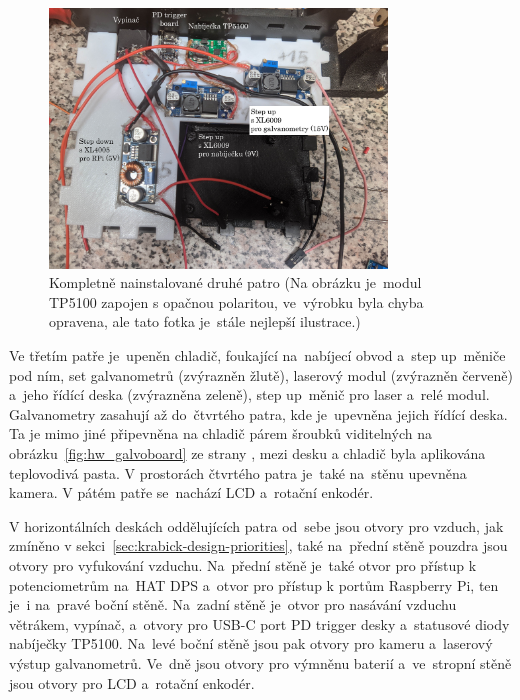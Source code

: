 \begin{figure}[htb]
  \centering
  \includegraphics[width=0.8\textwidth]{img/hw_layer0.jpg}
  \caption{\label{fig:hw_layer0} Kompletně nainstalované druhé patro (Na obrázku je~modul TP5100 zapojen s opačnou polaritou, ve~výrobku byla chyba opravena, ale tato fotka je~stále nejlepší ilustrace.)}
\end{figure}

Ve třetím patře je~upeněn chladič, foukající na~nabíjecí obvod a~step up~měniče pod ním, set galvanometrů (zvýrazněn žlutě), laserový modul (zvýrazněn červeně) a~jeho řídící deska (zvýrazněna zeleně), step up~měnič pro laser a~relé modul.  
Galvanometry zasahují až do~čtvrtého patra, kde je~upevněna jejich řídící deska. Ta je mimo jiné připevněna na chladič párem šroubků viditelných na obrázku~\ref{fig:hw_galvoboard} ze strany \pageref{fig:hw_galvoboard}, mezi desku a chladič byla aplikována teplovodivá pasta. V prostorách čtvrtého patra je~také na~stěnu upevněna kamera.
V pátém patře se~nachází LCD a~rotační enkodér.

V horizontálních deskách oddělujících patra od~sebe jsou otvory pro vzduch, jak zmíněno v sekci~\ref{sec:krabick-design-priorities}, také na~přední stěně pouzdra jsou otvory pro vyfukování vzduchu. Na~přední stěně je~také otvor pro přístup k potenciometrům na~HAT DPS a~otvor pro přístup k portům Raspberry Pi, ten je~i na~pravé boční stěně. Na~zadní stěně je~otvor pro nasávání vzduchu větrákem, vypínač, a~otvory pro USB-C port PD trigger desky a~statusové diody nabíječky TP5100. Na~levé boční stěně jsou pak otvory pro kameru a~laserový výstup galvanometrů. Ve~dně jsou otvory pro výmněnu baterií a~ve~stropní stěně jsou otvory pro LCD a~rotační enkodér.

